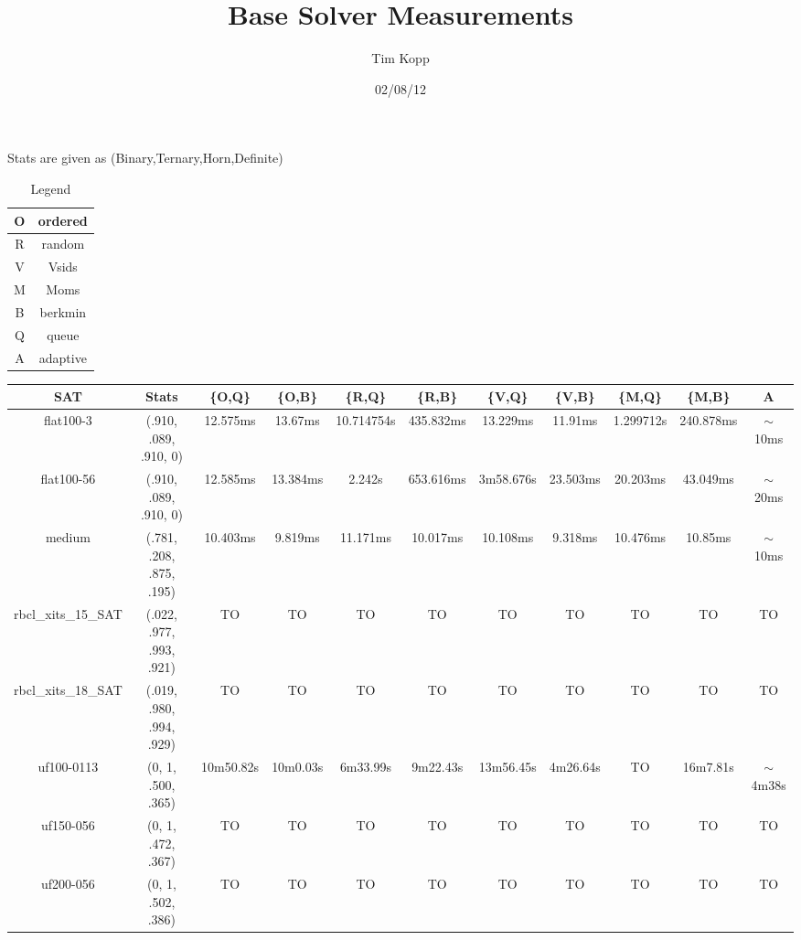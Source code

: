 \documentclass{article}
\title{Base Solver Measurements}
\author{Tim Kopp}
\date{02/08/12}
\begin{document}
\maketitle

Stats are given as (Binary,Ternary,Horn,Definite)
\begin{table}[ht!]
\centering
\begin{tabular}{|c|c|}\hline
O & ordered\\\hline
R & random\\\hline
V & Vsids\\\hline
M & Moms\\\hline\hline
B & berkmin\\\hline
Q & queue\\\hline\hline
A & adaptive\\\hline
\end{tabular}
\caption{Legend}
\end{table}

\begin{table}[ht!]
\centering
\begin{tabular}{|c|c||c|c|c|c|c|c|c|c||c|}\hline
SAT & Stats & \{O,Q\} & \{O,B\} & \{R,Q\} & \{R,B\} & \{V,Q\} & \{V,B\} &
\{M,Q\} & \{M,B\} & A\\\hline\hline

flat100-3 & (.910, .089, .910, 0) &
12.575ms & 13.67ms & 10.714754s & 435.832ms & 13.229ms & 11.91ms & 1.299712s &
240.878ms & $\sim$10ms\\\hline

flat100-56 & (.910, .089, .910, 0) &
12.585ms & 13.384ms & 2.242s & 653.616ms & 3m58.676s & 23.503ms & 20.203ms
& 43.049ms & $\sim$20ms\\\hline\hline

medium & (.781, .208, .875, .195) &
10.403ms & 9.819ms & 11.171ms & 10.017ms & 10.108ms & 9.318ms & 10.476ms &
10.85ms & $\sim$10ms\\\hline\hline

rbcl\_xits\_15\_SAT & (.022, .977, .993, .921) &
TO & TO & TO & TO & TO & TO &TO & TO & TO\\\hline

rbcl\_xits\_18\_SAT & (.019, .980, .994, .929) &
TO & TO & TO & TO & TO & TO &TO & TO & TO\\\hline\hline

uf100-0113 & (0, 1, .500, .365) &
10m50.82s & 10m0.03s & 6m33.99s & 9m22.43s & 13m56.45s &
4m26.64s & TO & 16m7.81s & $\sim$4m38s\\\hline

uf150-056 & (0, 1, .472, .367) &
TO & TO & TO & TO & TO & TO &TO & TO & TO\\\hline

uf200-056 & (0, 1, .502, .386) &
TO & TO & TO & TO & TO & TO &TO & TO & TO\\\hline
\end{tabular}
\end{table}
\end{document}
